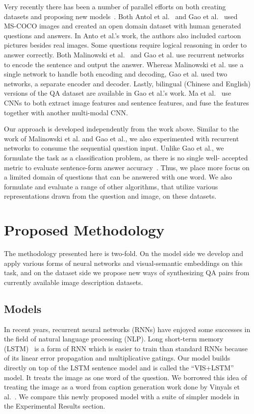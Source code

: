 Very recently there has been a number of parallel efforts on both creating
datasets and proposing new models~\cite{antol14, malinowski15, gao15, ma15}.
Both Antol et al.~\cite{antol14} and Gao et al.~\cite{gao15} used MS-COCO
\cite{mscoco} images and created an open domain dataset with human generated
questions and answers. In Anto et al.'s work, the authors also included cartoon
pictures besides real images. Some questions require logical reasoning in order
to answer correctly. Both Malinowski et al.~\cite{malinowski15} and Gao et al.
\cite{gao15} use recurrent networks to encode the sentence and output the
answer. Whereas Malinowski et al. use a single network to handle both encoding
and decoding, Gao et al. used two networks, a separate encoder and decoder.
Lastly, bilingual (Chinese and English) versions of the QA dataset are
available in Gao et al.'s work. Ma et al.~\cite{ma15} use CNNs to both extract
image features and sentence features, and fuse the features together with
another multi-modal CNN.

Our approach is developed independently from the work above. Similar to the
work of Malinowski et al. and Gao et al., we also experimented with recurrent
networks to consume the sequential question input. Unlike Gao et al., we
formulate the task as a classification problem, as there is no single well-
accepted metric to evaluate sentence-form answer
accuracy~\cite{mscoco_captions}. Thus, we place more focus on a limited domain
of questions that can be answered with one word. We also formulate and evaluate
a range of other algorithms, that utilize various representations drawn from
the question and image, on these datasets.

\section{Proposed Methodology}
The methodology presented here is two-fold. On the model side we develop and
apply various forms of neural networks and visual-semantic embeddings on this
task, and on the dataset side we propose new ways of synthesizing QA pairs from
currently available image description datasets.

\subsection{Models}
In recent years, recurrent neural networks (RNNs) have enjoyed some successes
in the field of natural language processing (NLP). Long short-term memory
(LSTM)~\cite{hochreiter97} is a form of RNN which is easier to train than
standard RNNs because of its linear error propagation and multiplicative
gatings. Our model builds directly on top of the LSTM sentence model and is
called the ``VIS+LSTM'' model. It treats the image as one word of the question.
We borrowed this idea of treating the image as a word from caption generation
work done by Vinyals et al.~\cite{vinyals14}. We compare this newly
proposed model with a suite of simpler models in the Experimental Results
section.

